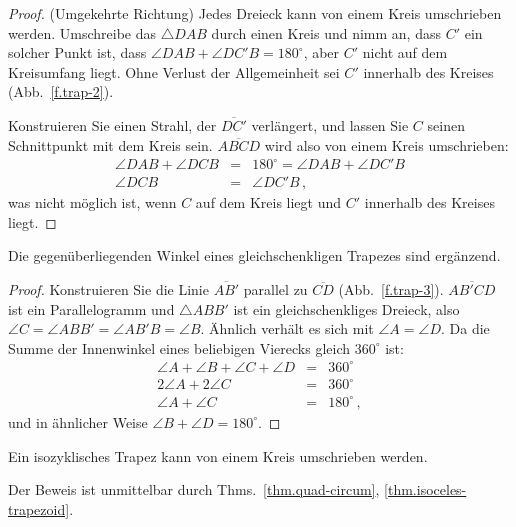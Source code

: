 \begin{proof}(Umgekehrte Richtung)
Jedes Dreieck kann von einem Kreis umschrieben werden. Umschreibe das $\triangle DAB$ durch einen Kreis und nimm an, dass $C'$ ein solcher Punkt ist, dass $\angle DAB + \angle DC'B = 180^\circ$, aber $C'$ nicht auf dem Kreisumfang liegt. Ohne Verlust der Allgemeinheit sei $C'$ innerhalb des Kreises (Abb.~\ref{f.trap-2}).

Konstruieren Sie einen Strahl, der $\overline{DC'}$ verlängert, und lassen Sie $C$ seinen Schnittpunkt mit dem Kreis sein. $\overline{ABCD}$ wird also von einem Kreis umschrieben:
\begin{eqnarray*}
\angle DAB + \angle DCB &=&  180^\circ = \angle DAB + \angle DC'B\\
\angle DCB &=& \angle DC'B\,,
\end{eqnarray*}
was nicht möglich ist, wenn $C$ auf dem Kreis liegt und $C'$ innerhalb des Kreises liegt.
\end{proof}

\begin{theorem}\label{thm.isoceles-trapezoid}
Die gegenüberliegenden Winkel eines gleichschenkligen Trapezes sind ergänzend.
\end{theorem}
\begin{proof}
Konstruieren Sie die Linie $\overline{AB'}$ parallel zu $\overline{CD}$ (Abb.~\ref{f.trap-3}). $\overline{AB'CD}$ ist ein Parallelogramm und $\triangle ABB'$ ist ein gleichschenkliges Dreieck, also $\angle C= \angle ABB' = \angle AB'B = \angle B$. Ähnlich verhält es sich mit $\angle A = \angle D$. Da die Summe der Innenwinkel eines beliebigen Vierecks gleich $360^\circ$ ist:
\begin{eqnarray*}
\angle A + \angle B + \angle C + \angle D &=& 360^\circ\\
2\angle A + 2 \angle C &=& 360^\circ\\
\angle A +  \angle C &=& 180^\circ\,,
\end{eqnarray*}
und in ähnlicher Weise $\angle B +  \angle D = 180^\circ$.
\end{proof}
\begin{theorem}
Ein isozyklisches Trapez kann von einem Kreis umschrieben werden.
\end{theorem}
Der Beweis ist unmittelbar durch Thms.~\ref{thm.quad-circum}, \ref{thm.isoceles-trapezoid}.

